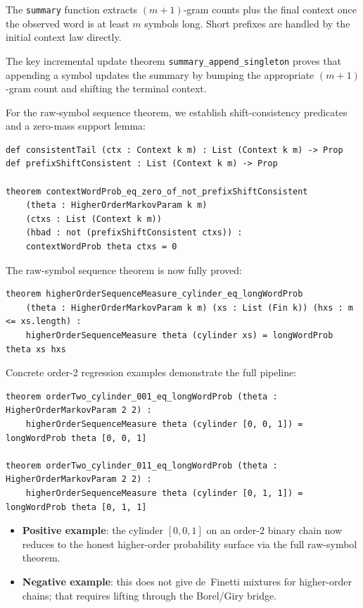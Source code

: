 \documentclass[11pt,a4paper]{article}
\theoremstyle{definition}
\begin{document}
The \texttt{summary} function extracts $(m+1)$-gram counts plus the final
context once the observed word is at least $m$ symbols long. Short prefixes
are handled by the initial context law directly.

The key incremental update theorem \texttt{summary\_append\_singleton} proves
that appending a symbol updates the summary by bumping the appropriate
$(m+1)$-gram count and shifting the terminal context.

For the raw-symbol sequence theorem, we establish shift-consistency predicates
and a zero-mass support lemma:
\begin{lstlisting}
def consistentTail (ctx : Context k m) : List (Context k m) -> Prop
def prefixShiftConsistent : List (Context k m) -> Prop

theorem contextWordProb_eq_zero_of_not_prefixShiftConsistent
    (theta : HigherOrderMarkovParam k m)
    (ctxs : List (Context k m))
    (hbad : not (prefixShiftConsistent ctxs)) :
    contextWordProb theta ctxs = 0
\end{lstlisting}

The raw-symbol sequence theorem is now fully proved:
\begin{lstlisting}
theorem higherOrderSequenceMeasure_cylinder_eq_longWordProb
    (theta : HigherOrderMarkovParam k m) (xs : List (Fin k)) (hxs : m <= xs.length) :
    higherOrderSequenceMeasure theta (cylinder xs) = longWordProb theta xs hxs
\end{lstlisting}

Concrete order-2 regression examples demonstrate the full pipeline:
\begin{lstlisting}
theorem orderTwo_cylinder_001_eq_longWordProb (theta : HigherOrderMarkovParam 2 2) :
    higherOrderSequenceMeasure theta (cylinder [0, 0, 1]) = longWordProb theta [0, 0, 1]

theorem orderTwo_cylinder_011_eq_longWordProb (theta : HigherOrderMarkovParam 2 2) :
    higherOrderSequenceMeasure theta (cylinder [0, 1, 1]) = longWordProb theta [0, 1, 1]
\end{lstlisting}

\begin{itemize}
\item \textbf{Positive example}: the cylinder $[0,0,1]$ on an order-2 binary chain
  now reduces to the honest higher-order probability surface via the full
  raw-symbol theorem.
\item \textbf{Negative example}: this does not give de~Finetti mixtures for
  higher-order chains; that requires lifting through the Borel/Giry bridge.
\end{itemize}
\end{document}
